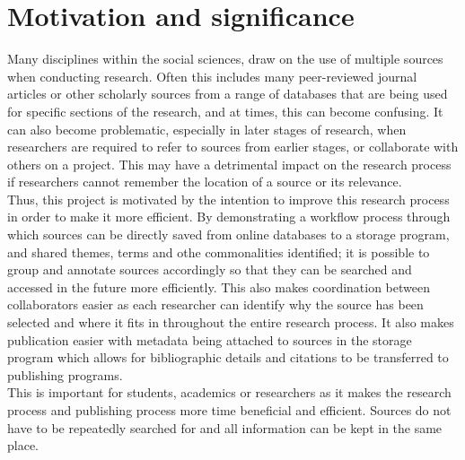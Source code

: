 \documentclass[preprint,12pt, a4paper]{elsarticle}
\begin{document}




\section{Motivation and significance}
\label{}


Many disciplines within the social sciences, draw on the use of multiple sources when conducting research. Often this includes many peer-reviewed journal articles or other scholarly sources from a range of databases that are being used for specific sections of the research, and at times, this can become confusing. It can also become problematic, especially in later stages of research, when researchers are required to refer to sources from earlier stages, or collaborate with others on a project. This may have a detrimental impact on the research process if researchers cannot remember the location of a source or its relevance.\\
Thus, this project is motivated by the intention to improve this research process in order to make it more efficient. By demonstrating a workflow process through which sources can be directly saved from online databases to a storage program, and shared themes, terms and othe commonalities identified; it is possible to group and annotate sources accordingly so that they can be searched and accessed in the future more efficiently. This also makes coordination between collaborators easier as each researcher can identify why the source has been selected and where it fits in throughout the entire research process. It also makes publication easier with metadata being attached to sources in the storage program which allows for bibliographic details and citations to be transferred to publishing programs. \\
This is important for students, academics or researchers as it makes the research process and publishing process more time beneficial and efficient. Sources do not have to be repeatedly searched for and all information can be kept in the same place.
\end{document}
